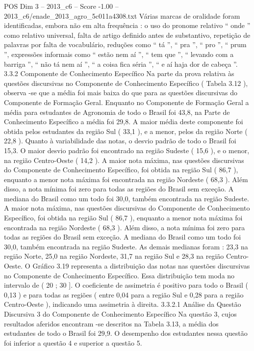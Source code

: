 \begin{textsample}{POS Dim 3 – 2013\_c6 – Score -1.00 – 2013\_c6/enade\_2013\_agro\_5c011a4308.txt}
Várias marcas de oralidade foram identificadas, embora não em alta frequência : o uso do pronome relativo “ onde ” como relativo universal, falta de artigo definido antes de substantivo, repetição de palavras por falta de vocabulário, reduções como “ tá ”, “ pra ”, “ pro ”, “ prum ”, expressões informais como “ estão nem aí ”, “ tem que ”, “ levando com a barriga ”, “ não tá nem aí ”, “ a coisa fica séria ”, “ e aí haja dor de cabeça ”. 3.3.2 Componente de Conhecimento Específico Na parte da prova relativa às questões discursivas no Componente de Conhecimento Específico ( Tabela 3.12 ), observa -se que a média foi mais baixa do que para as questões discursivas do Componente de Formação Geral.
Enquanto no Componente de Formação Geral a média para estudantes de Agronomia de todo o Brasil foi 43,8, na Parte de Conhecimento Específico a média foi 29,8.
A maior média deste componente foi obtida pelos estudantes da região Sul ( 33,1 ), e a menor, pelos da região Norte ( 22,8 ).
Quanto à variabilidade das notas, o desvio padrão de todo o Brasil foi 15,3.
O maior desvio padrão foi encontrado na região Sudeste ( 15,6 ), e o menor, na região Centro-Oeste ( 14,2 ).
A maior nota máxima, nas questões discursivas do Componente de Conhecimento Específico, foi obtida na região Sul ( 86,7 ), enquanto a menor nota máxima foi encontrada na região Nordeste ( 68,3 ).
Além disso, a nota mínima foi zero para todas as regiões do Brasil sem exceção.
A mediana do Brasil como um todo foi 30,0, também encontrada na região Sudeste.
A maior nota máxima, nas questões discursivas do Componente de Conhecimento Específico, foi obtida na região Sul ( 86,7 ), enquanto a menor nota máxima foi encontrada na região Nordeste ( 68,3 ).
Além disso, a nota mínima foi zero para todas as regiões do Brasil sem exceção.
A mediana do Brasil como um todo foi 30,0, também encontrada na região Sudeste.
As demais medianas foram : 23,3 na região Norte, 25,0 na região Nordeste, 31,7 na região Sul e 28,3 na região Centro-Oeste.
O Gráfico 3.19 representa a distribuição das notas nas questões discursivas no Componente de Conhecimento Específico.
Essa distribuição tem moda no intervalo de ( 20 ; 30 ].
O coeficiente de assimetria é positivo para todo o Brasil ( 0,13 ) e para todas as regiões ( entre 0,04 para a região Sul e 0,28 para a região Centro-Oeste ), indicando uma assimetria à direita. 3.3.2.1 Análise da Questão Discursiva 3 do Componente de Conhecimento Específico Na questão 3, cujos resultados aferidos encontram -se descritos na Tabela 3.13, a média dos estudantes de todo o Brasil foi 29,9.
O desempenho dos estudantes nessa questão foi inferior a questão 4 e superior a questão 5.

\end{textsample}
